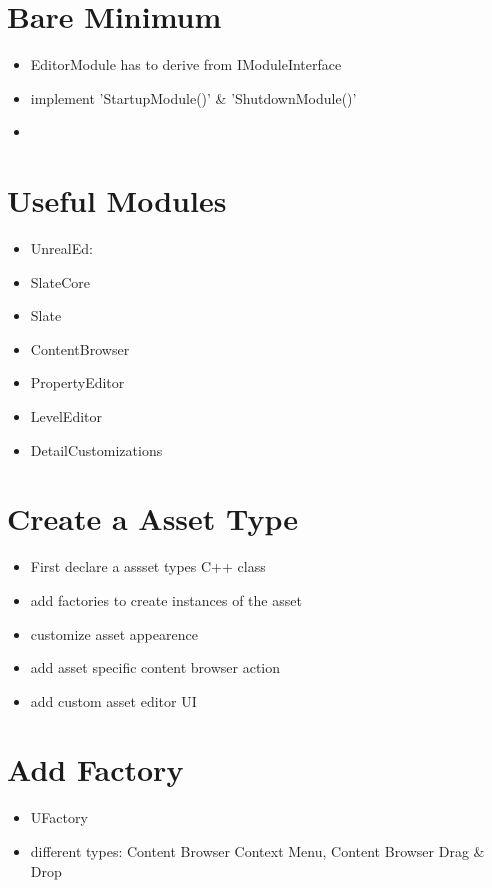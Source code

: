     \section{Bare Minimum}
        \begin{itemize}
            \item EditorModule has to derive from IModuleInterface
            \item implement 'StartupModule()' \& 'ShutdownModule()'
            \item 
        \end{itemize}

    \section{Useful Modules}
        \begin{itemize}
            \item UnrealEd:
            \item SlateCore
            \item Slate
            \item ContentBrowser
            \item PropertyEditor
            \item LevelEditor
            \item DetailCustomizations
        \end{itemize}

    \section{Create a Asset Type}
        \begin{itemize}
            \item First declare a assset types C++ class
            \item add factories to create instances of the asset
            \item customize asset appearence
            \item add asset specific content browser action
            \item add custom asset editor UI
        \end{itemize}

    \section{Add Factory}
        \begin{itemize}
            \item UFactory
            \item different types: Content Browser Context Menu, Content Browser Drag \& Drop
        \end{itemize}

